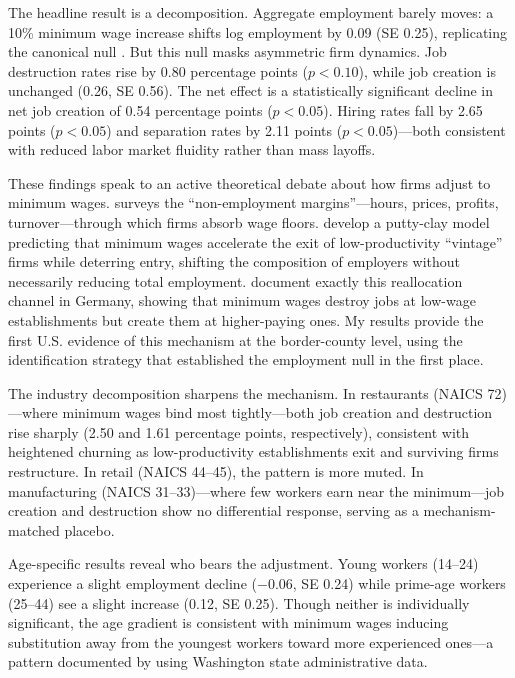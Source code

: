 \documentclass[12pt]{article}
\begin{document}
The headline result is a decomposition. Aggregate employment barely moves: a 10\% minimum wage increase shifts log employment by 0.09 (SE 0.25), replicating the canonical null \citep{dube2010minimum, allegretto2011minimum}. But this null masks asymmetric firm dynamics. Job destruction rates rise by 0.80 percentage points ($p < 0.10$), while job creation is unchanged (0.26, SE 0.56). The net effect is a statistically significant decline in net job creation of 0.54 percentage points ($p < 0.05$). Hiring rates fall by 2.65 points ($p < 0.05$) and separation rates by 2.11 points ($p < 0.05$)---both consistent with reduced labor market fluidity rather than mass layoffs.

These findings speak to an active theoretical debate about how firms adjust to minimum wages. \citet{clemens2021firms} surveys the ``non-employment margins''---hours, prices, profits, turnover---through which firms absorb wage floors. \citet{aaronson2018industry} develop a putty-clay model predicting that minimum wages accelerate the exit of low-productivity ``vintage'' firms while deterring entry, shifting the composition of employers without necessarily reducing total employment. \citet{dustmann2022reallocation} document exactly this reallocation channel in Germany, showing that minimum wages destroy jobs at low-wage establishments but create them at higher-paying ones. My results provide the first U.S. evidence of this mechanism at the border-county level, using the identification strategy that established the employment null in the first place.

The industry decomposition sharpens the mechanism. In restaurants (NAICS 72)---where minimum wages bind most tightly---both job creation and destruction rise sharply (2.50 and 1.61 percentage points, respectively), consistent with heightened churning as low-productivity establishments exit and surviving firms restructure. In retail (NAICS 44--45), the pattern is more muted. In manufacturing (NAICS 31--33)---where few workers earn near the minimum---job creation and destruction show no differential response, serving as a mechanism-matched placebo.

Age-specific results reveal who bears the adjustment. Young workers (14--24) experience a slight employment decline ($-0.06$, SE 0.24) while prime-age workers (25--44) see a slight increase (0.12, SE 0.25). Though neither is individually significant, the age gradient is consistent with minimum wages inducing substitution away from the youngest workers toward more experienced ones---a pattern documented by \citet{jardim2022minimum} using Washington state administrative data.
\end{document}
